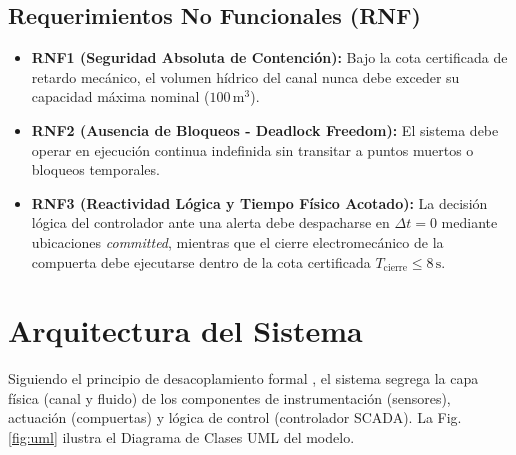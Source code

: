 \documentclass[conference]{IEEEtran}
\begin{document}
\subsection{Requerimientos No Funcionales (RNF)}
\begin{itemize}
    \item \textbf{RNF1 (Seguridad Absoluta de Contención):} Bajo la cota certificada de retardo mecánico, el volumen hídrico del canal nunca debe exceder su capacidad máxima nominal ($100\,\text{m}^3$).
    \item \textbf{RNF2 (Ausencia de Bloqueos - Deadlock Freedom):} El sistema debe operar en ejecución continua indefinida sin transitar a puntos muertos o bloqueos temporales.
    \item \textbf{RNF3 (Reactividad Lógica y Tiempo Físico Acotado):} La decisión lógica del controlador ante una alerta debe despacharse en $\Delta t = 0$ mediante ubicaciones \textit{committed}, mientras que el cierre electromecánico de la compuerta debe ejecutarse dentro de la cota certificada $T_{\text{cierre}} \leq 8\,\text{s}$.
\end{itemize}

\section{Arquitectura del Sistema}
Siguiendo el principio de desacoplamiento formal \cite{fitzgerald2010collaborative}, el sistema segrega la capa física (canal y fluido) de los componentes de instrumentación (sensores), actuación (compuertas) y lógica de control (controlador SCADA). La Fig. \ref{fig:uml} ilustra el Diagrama de Clases UML del modelo.
\end{document}
